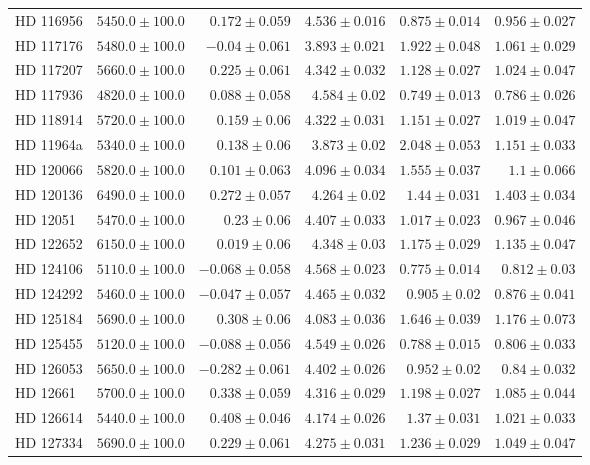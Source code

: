 \begin{longtable*}{lrrrrr}
HD 116956 & $5450.0\pm 100.0$ & $0.172\pm 0.059$ & $4.536\pm 0.016$ & $0.875\pm 0.014$ & $0.956\pm 0.027$ \\ 
HD 117176 & $5480.0\pm 100.0$ & $-0.04\pm 0.061$ & $3.893\pm 0.021$ & $1.922\pm 0.048$ & $1.061\pm 0.029$ \\ 
HD 117207 & $5660.0\pm 100.0$ & $0.225\pm 0.061$ & $4.342\pm 0.032$ & $1.128\pm 0.027$ & $1.024\pm 0.047$ \\ 
HD 117936 & $4820.0\pm 100.0$ & $0.088\pm 0.058$ & $4.584\pm 0.02$ & $0.749\pm 0.013$ & $0.786\pm 0.026$ \\ 
HD 118914 & $5720.0\pm 100.0$ & $0.159\pm 0.06$ & $4.322\pm 0.031$ & $1.151\pm 0.027$ & $1.019\pm 0.047$ \\ 
HD 11964a & $5340.0\pm 100.0$ & $0.138\pm 0.06$ & $3.873\pm 0.02$ & $2.048\pm 0.053$ & $1.151\pm 0.033$ \\ 
HD 120066 & $5820.0\pm 100.0$ & $0.101\pm 0.063$ & $4.096\pm 0.034$ & $1.555\pm 0.037$ & $1.1\pm 0.066$ \\ 
HD 120136 & $6490.0\pm 100.0$ & $0.272\pm 0.057$ & $4.264\pm 0.02$ & $1.44\pm 0.031$ & $1.403\pm 0.034$ \\ 
HD 12051 & $5470.0\pm 100.0$ & $0.23\pm 0.06$ & $4.407\pm 0.033$ & $1.017\pm 0.023$ & $0.967\pm 0.046$ \\ 
HD 122652 & $6150.0\pm 100.0$ & $0.019\pm 0.06$ & $4.348\pm 0.03$ & $1.175\pm 0.029$ & $1.135\pm 0.047$ \\ 
HD 124106 & $5110.0\pm 100.0$ & $-0.068\pm 0.058$ & $4.568\pm 0.023$ & $0.775\pm 0.014$ & $0.812\pm 0.03$ \\ 
HD 124292 & $5460.0\pm 100.0$ & $-0.047\pm 0.057$ & $4.465\pm 0.032$ & $0.905\pm 0.02$ & $0.876\pm 0.041$ \\ 
HD 125184 & $5690.0\pm 100.0$ & $0.308\pm 0.06$ & $4.083\pm 0.036$ & $1.646\pm 0.039$ & $1.176\pm 0.073$ \\ 
HD 125455 & $5120.0\pm 100.0$ & $-0.088\pm 0.056$ & $4.549\pm 0.026$ & $0.788\pm 0.015$ & $0.806\pm 0.033$ \\ 
HD 126053 & $5650.0\pm 100.0$ & $-0.282\pm 0.061$ & $4.402\pm 0.026$ & $0.952\pm 0.02$ & $0.84\pm 0.032$ \\ 
HD 12661 & $5700.0\pm 100.0$ & $0.338\pm 0.059$ & $4.316\pm 0.029$ & $1.198\pm 0.027$ & $1.085\pm 0.044$ \\ 
HD 126614 & $5440.0\pm 100.0$ & $0.408\pm 0.046$ & $4.174\pm 0.026$ & $1.37\pm 0.031$ & $1.021\pm 0.033$ \\ 
HD 127334 & $5690.0\pm 100.0$ & $0.229\pm 0.061$ & $4.275\pm 0.031$ & $1.236\pm 0.029$ & $1.049\pm 0.047$ \\ 

\end{longtable*}
